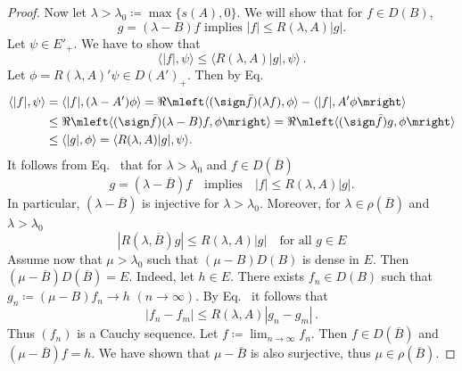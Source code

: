 \begin{proof}
Now let $\lambda > \lambda_{0} \coloneq \max\{s(A),0\}$. 
We will show that for $f \in D(B)$,
\begin{equation}\label{eq:c2-4.6}
g = (\lambda - B)f \text{ implies } |f| \leq R(\lambda,A)|g|.
\end{equation}
Let $\psi \in E'_{+}$. 
We have to show that 
\[
\langle|f|,\psi\rangle \leq \langle R(\lambda,A)|g|,\psi\rangle\,.
\]
Let $\phi = R(\lambda,A)'\psi \in D(A')_{+}$. 
Then by Eq.~
\begin{align*}
\langle|f|,\psi\rangle &= \langle|f|, (\lambda - A')\phi\rangle 
= \Re\mleft\langle(\sign  \bar{f})(\lambda f),\phi\rangle - \langle|f|,A'\phi\mright\rangle\\
&\leq \Re\mleft\langle(\sign  \bar{f})(\lambda - B)f,\phi\mright\rangle = \Re\mleft\langle(\sign  \bar{f})g,\phi\mright\rangle\\
&\leq \langle|g|,\phi\rangle = \langle R(\lambda,A)|g|,\psi\rangle.
\end{align*}
It follows from Eq.~ that for $\lambda > \lambda_{0}$ and $f \in D(\overline{B})$
\begin{equation}\label{eq:c2-4.7}
g = (\lambda - \overline{B})f \quad\text{implies}\quad |f| \leq R(\lambda,A)|g|.
\end{equation}
In particular, $(\lambda - \overline{B})$ is injective for $\lambda > \lambda_{0}$. 
Moreover, for $\lambda \in \rho(\overline{B})$ and 
$\lambda > \lambda_{0}$
\begin{equation}\label{eq:c2-4.8}
|R(\lambda,\overline{B})g| \leq R(\lambda,A)|g| \quad \text{for all } g \in E
\end{equation}
Assume now that $\mu > \lambda_{0}$ such that $(\mu - B)D(B)$ is dense in $E$. 
Then 
$(\mu - \overline{B})D(\overline{B}) = E$. 
Indeed, let $h \in E$. 
There exists $f_{n} \in D(B)$ such that $g_{n} \coloneq (\mu - B)f_{n} \to h$ $(n \to \infty)$. 
By Eq.~ it follows that 
\[
|f_{n} - f_{m}| \leq R(\lambda,A)|g_{n} - g_{m}|\,.
\] 
Thus $(f_{n})$ is a Cauchy sequence. 
Let $f \coloneq \lim_{n \to \infty} f_{n}$. 
Then $f \in D(\overline{B})$ and $(\mu - \overline{B})f = h$. We have shown that $\mu - \overline{B}$ is also surjective, thus $\mu \in \rho(\overline{B})$.


\end{proof}
